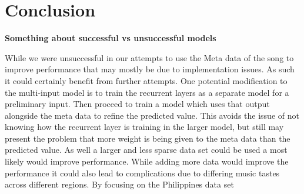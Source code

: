\documentclass[11pt]{article}
\begin{document}
% 
% 
\section{Conclusion}
\textbf{Something about successful vs unsuccessful models}


While we were unsuccessful in our attempts to use the Meta data of the song to improve performance that may mostly be due to implementation issues. As such it could certainly benefit from further attempts. One potential modification to the multi-input model is to train the recurrent layers as a separate model for a preliminary input. Then proceed to train a model which uses that output alongside the meta data to refine the predicted value. This avoids the issue of not knowing how the recurrent layer is training in the larger model, but still may present the problem that more weight is being given to the meta data than the predicted value. As well a larger and less sparse data set could be used a most likely would improve performance.
While adding more data would improve the performance it could also lead to complications due to differing music tastes across different regions. By focusing on the Philippines data set  


% 
\end{document}
